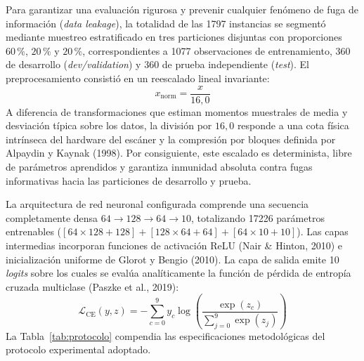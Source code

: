\documentclass[12pt,letterpaper]{article}
\begin{document}
Para garantizar una evaluación rigurosa y prevenir cualquier fenómeno de fuga de información (\textit{data leakage}), la totalidad de las 1797 instancias se segmentó mediante muestreo estratificado en tres particiones disjuntas con proporciones $60\,\%$, $20\,\%$ y $20\,\%$, correspondientes a 1077 observaciones de entrenamiento, 360 de desarrollo (\textit{dev/validation}) y 360 de prueba independiente (\textit{test}). El preprocesamiento consistió en un reescalado lineal invariante:
\begin{equation}
x_{\text{norm}} = \frac{x}{16{,}0}
\end{equation}
A diferencia de transformaciones que estiman momentos muestrales de media y desviación típica sobre los datos, la división por $16{,}0$ responde a una cota física intrínseca del hardware del escáner y la compresión por bloques definida por Alpaydin y Kaynak (1998). Por consiguiente, este escalado es determinista, libre de parámetros aprendidos y garantiza inmunidad absoluta contra fugas informativas hacia las particiones de desarrollo y prueba.

La arquitectura de red neuronal configurada comprende una secuencia completamente densa $64 \to 128 \to 64 \to 10$, totalizando 17226 parámetros entrenables ($[64\times 128 + 128] + [128\times 64 + 64] + [64\times 10 + 10]$). Las capas intermedias incorporan funciones de activación ReLU (Nair \& Hinton, 2010) e inicialización uniforme de Glorot y Bengio (2010). La capa de salida emite 10 \textit{logits} sobre los cuales se evalúa analíticamente la función de pérdida de entropía cruzada multiclase (Paszke et al., 2019):
\begin{equation}
\mathcal{L}_{\text{CE}}(y, z) = -\sum_{c=0}^{9} y_c \log \left( \frac{\exp(z_c)}{\sum_{j=0}^{9} \exp(z_j)} \right)
\end{equation}
La Tabla~\ref{tab:protocolo} compendia las especificaciones metodológicas del protocolo experimental adoptado.
\end{document}
